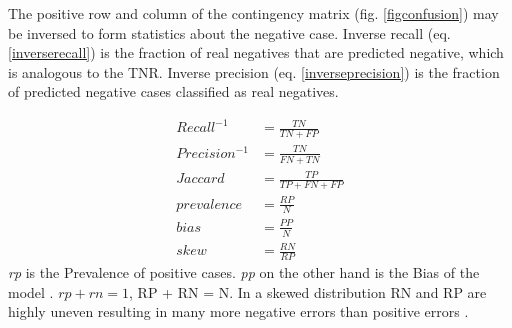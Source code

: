 \documentclass[english,12pt,a4paper,pdftex,elec,utf8, table]{aaltothesis}
\begin{document}
The positive row and column of the contingency matrix (fig. \ref{figconfusion}) may be inversed to form statistics about the negative case. Inverse recall (eq. \ref{inverserecall}) is the fraction of real negatives that are predicted negative, which is analogous to the TNR. Inverse precision (eq. \ref{inverseprecision}) is the fraction of predicted negative cases classified as real negatives. \cite{POWERS2011}

\begin{align}
Recall^{-1} &= \frac{TN}{TN + FP}\label{inverserecall}\\
Precision^{-1} &= \frac{TN}{FN + TN} \label{inverseprecision}\\
Jaccard &= \frac{TP}{TP + FN + FP}\label{jaccard}\\
prevalence &= \frac{RP}{N}\label{prevalence}\\
bias &= \frac{PP}{N}\label{bias}\\
skew &= \frac{RN}{RP}\label{skew}
\end{align}
\emph{rp} is the Prevalence of positive cases. \emph{pp} on the other hand is the Bias of the model \cite{lafferty2001conditional}. $rp + rn = 1$, RP + RN = N. In a skewed distribution RN and RP are highly uneven resulting in many more negative errors than positive errors \cite{POWERS2011}.
\end{document}

